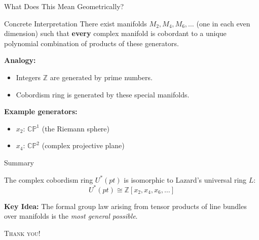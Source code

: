 \documentclass{beamer}
\begin{document}
\begin{frame}{What Does This Mean Geometrically?}
  \begin{block}{Concrete Interpretation}
    There exist manifolds $M_2, M_4, M_6, \dots$ (one in each even dimension) such that \textbf{every} complex manifold is cobordant to a unique polynomial combination of products of these generators.
  \end{block}
  \vfill
  \textbf{Analogy:}
  \begin{itemize}
    \item Integers $\mathbb{Z}$ are generated by prime numbers.
    \item Cobordism ring is generated by these special manifolds.
  \end{itemize}
  \vfill
  \textbf{Example generators:}
  \begin{itemize}
    \item $x_2$: $\mathbb{CP}^1$ (the Riemann sphere)
    \item $x_4$: $\mathbb{CP}^2$ (complex projective plane)
  \end{itemize}
\end{frame}

\begin{frame}{Summary}
  \begin{theorem}[Quillen, 1971]
  The complex cobordism ring $U^*(pt)$ is isomorphic to Lazard's universal ring $L$:
  \[
    U^*(pt) \cong \mathbb{Z}[x_2, x_4, x_6, \dots]
  \]
  \end{theorem}
  \begin{center}
    \textbf{Key Idea:} The formal group law arising from tensor products of line bundles over manifolds is the \textit{most general possible}.
  \end{center}
  \vfill
  \begin{flushright}
    \textsc{Thank you!}
  \end{flushright}
\end{frame}
\end{document}
